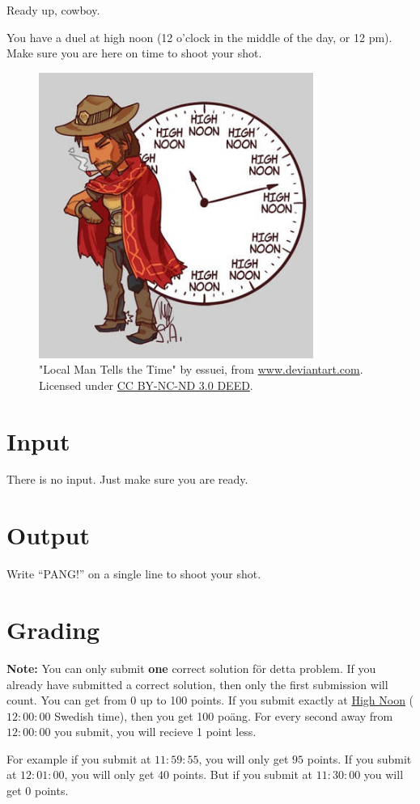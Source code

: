 
Ready up, cowboy. 

You have a duel at high noon (12 o'clock in the middle of the day, or 12 pm). 
Make sure you are here on time to shoot your shot.

\begin{centering}
  \begin{figure}[h]
      \centering
      \includegraphics[width=0.8\textwidth]{highnoon.jpg}
      \caption{"Local Man Tells the Time" by essuei, from \href{https://www.deviantart.com/essuei/art/Overwatch-Local-Man-Tells-the-Time-614496598}{www.deviantart.com}. Licensed under \href{https://creativecommons.org/licenses/by-nc-nd/3.0/}{CC BY-NC-ND 3.0 DEED}.}
  \end{figure}
\end{centering}

\section*{Input}
There is no input. Just make sure you are ready.

\section*{Output}
Write ``PANG!'' on a single line to shoot your shot.

\section*{Grading}
\textbf{Note:} You can only submit \textbf{one} correct solution för detta problem. If you already have submitted a correct solution, then only the first submission will count. 
You can get from 0 up to 100 points. If you submit exactly at \href{https://www.timeanddate.com/worldclock/fixedtime.html?msg=Ready+yourself%2C+Cowboy&iso=20240401T12&p1=239}{High Noon} 
($12:00:00$ Swedish time), then you get 100 poäng. For every second away from $12:00:00$ you submit, you will recieve 1 point less. 

For example if you submit at $11:59:55$, you will only get $95$ points. If you submit at $12:01:00$, you will only get $40$ points.
But if you submit at $11:30:00$ you will get $0$ points.

